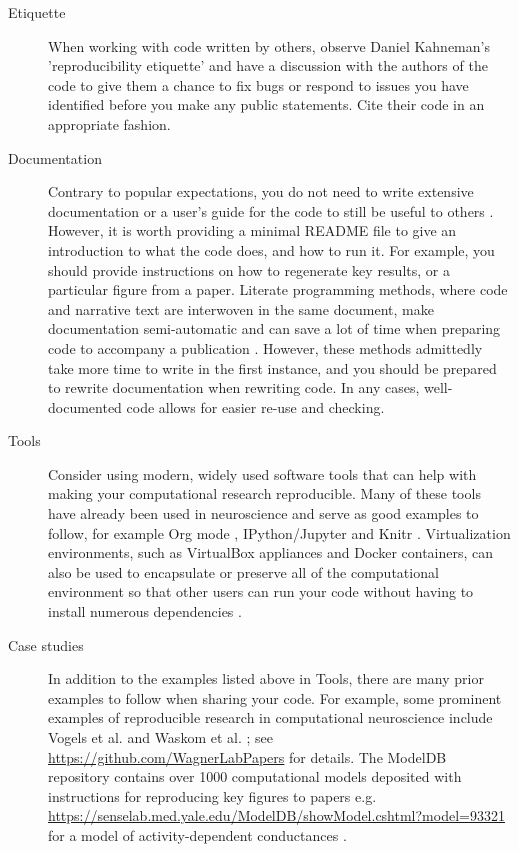 \documentclass[11pt]{article}
\begin{document}
\begin{description}
\item [Etiquette] When working with code written by others, observe
  Daniel Kahneman's 'reproducibility etiquette'\cite{Kahneman2014} and
  have a discussion with the authors of the code to give them a chance
  to fix bugs or respond to issues you have identified before you make
  any public statements.  Cite their code in an appropriate fashion.


\item [Documentation] Contrary to popular expectations, you do not
  need to write extensive documentation or a user's guide for the code
  to still be useful to others \cite{Barnes2010-iv}.  However, it is
  worth providing a minimal README file to give an introduction to
  what the code does, and how to run it.  For example, you should
  provide instructions on how to regenerate key results, or a
  particular figure from a paper. Literate programming methods, where
  code and narrative text are interwoven in the same document, make
  documentation semi-automatic and can save a lot of time when
  preparing code to accompany a publication \cite{schulte2012multi,
    gentleman2012statistical}. However, these methods admittedly take
  more time to write in the first instance, and you should be prepared
  to rewrite documentation when rewriting code.  In any cases,
  well-documented code allows for easier re-use and checking.

\item [Tools] Consider using modern, widely used software tools that
  can help with making your computational research reproducible.  Many
  of these tools have already been used in neuroscience and serve as
  good examples to follow, for example Org mode \cite{Delescluse2011},
  IPython/Jupyter \cite{Stevens2013} and Knitr \cite{Eglen2014}.
  Virtualization environments, such as VirtualBox appliances and
  Docker containers, can also be used to encapsulate or preserve all
  of the computational environment so that other users can run your
  code without having to install numerous dependencies
  \cite{Boettiger2015}.


\item [Case studies] In addition to the examples listed above in
  Tools\cite{Delescluse2011,Stevens2013,Eglen2014}, there are many
  prior examples to follow when sharing your code.  For example, some
  prominent examples of reproducible research in computational
  neuroscience include Vogels et al. \cite{Vogels2011-c8c} and Waskom
  et al. \cite{Waskom2014-gd}; see
  \url{https://github.com/WagnerLabPapers} for details.  The ModelDB
  repository contains over 1000 computational models deposited with
  instructions for reproducing key figures to papers
  e.g. \url{https://senselab.med.yale.edu/ModelDB/showModel.cshtml?model=93321}
  for a model of activity-dependent conductances \cite{Liu1998}.




\end{description}
\end{document}
